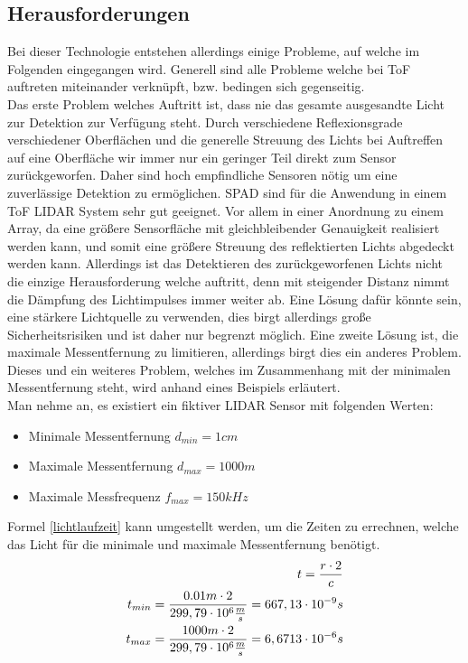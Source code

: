 \subsection{Herausforderungen}\label{subsec:tof_herausvorderungen}
Bei dieser Technologie entstehen allerdings einige Probleme, auf welche im Folgenden eingegangen wird. Generell sind alle Probleme welche bei \ac{ToF} auftreten miteinander verknüpft, bzw. bedingen sich gegenseitig. \\
Das erste Problem welches Auftritt ist, dass nie das gesamte ausgesandte Licht zur Detektion zur Verfügung steht. Durch verschiedene Reflexionsgrade verschiedener Oberflächen und die generelle Streuung des Lichts bei Auftreffen auf eine Oberfläche wir immer nur ein geringer Teil direkt zum Sensor zurückgeworfen. Daher sind hoch empfindliche Sensoren nötig um eine zuverlässige Detektion zu ermöglichen.
\ac{SPAD} sind für die Anwendung in einem \ac{ToF} \ac{LIDAR} System sehr gut geeignet. Vor allem in einer Anordnung zu einem Array, da eine größere Sensorfläche mit gleichbleibender Genauigkeit realisiert werden kann, und somit eine größere Streuung des reflektierten Lichts abgedeckt werden kann. Allerdings ist das Detektieren des zurückgeworfenen Lichts nicht die einzige Herausforderung welche auftritt, denn mit steigender Distanz nimmt die Dämpfung des Lichtimpulses immer weiter ab. 
Eine Lösung dafür könnte sein, eine stärkere Lichtquelle zu verwenden, dies birgt allerdings große Sicherheitsrisiken und ist daher nur begrenzt möglich. Eine zweite Lösung ist, die maximale Messentfernung zu limitieren, allerdings birgt dies ein anderes Problem. Dieses und ein weiteres Problem, welches im Zusammenhang mit der minimalen Messentfernung steht, wird anhand eines Beispiels erläutert.\\
Man nehme an, es existiert ein fiktiver \ac{LIDAR} Sensor mit folgenden Werten:
\begin{itemize}
	\item Minimale Messentfernung $d_{min}=1 cm$
	\item Maximale Messentfernung $d_{max}=1000 m$
	\item Maximale Messfrequenz $f_{max}=150 kHz$ 
\end{itemize}
Formel \ref{lichtlaufzeit} kann umgestellt werden, um die Zeiten zu errechnen, welche das Licht für die minimale und maximale Messentfernung benötigt. 
\begin{equation}\formelentry{Berechnung der minimalen und maximalen Zeit}
	\begin{split}
		t = \frac{r \cdot 2}{c}\\
		t_{min} = \frac{0.01 m \cdot 2}{299,79 \cdot 10^6 \frac{m}{s}} = 667,13 \cdot 10^{-9}s\\
		t_{max} = \frac{1000 m \cdot 2}{299,79 \cdot 10^6 \frac{m}{s}} = 6,6713 \cdot 10^{-6}s\\
	\end{split}
\end{equation} 
